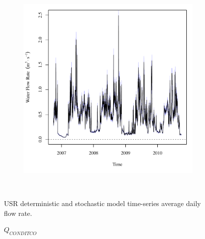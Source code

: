\begin{linenumbers}
\begin{landscape}
\begin{figure}
\begin{subfigure}{0.7\textwidth}
		\end{subfigure}%
		\begin{subfigure}{0.7\textwidth}
			\centering
			\includegraphics[width=\tableCustomSize]{"Figures/Results_USR/Stochastic/Q CAN"}
		\end{subfigure}\\
		\caption{USR deterministic and stochastic model time-series average daily flow rate.}
	\end{figure}
\end{landscape}
\subfiguremid
\begin{landscape}
	\begin{figure}
		\centering
		$ Q_{CONDITCO} $
		\begin{subfigure}{0.7\textwidth}
			\centering

\end{subfigure}
\end{figure}
\end{landscape}
\end{linenumbers}

